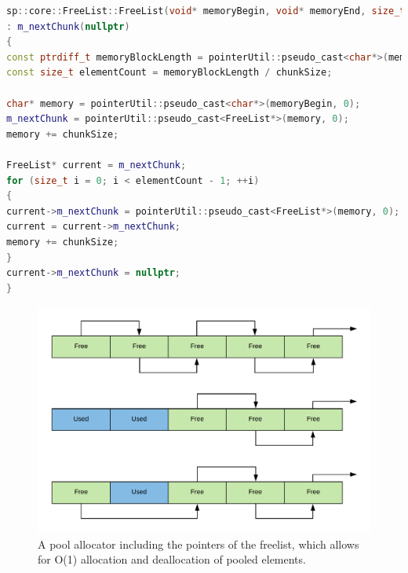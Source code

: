 \begin{lstlisting}[caption={Constructor of the FreeList class in the C++ project. It showcases how the list is created in a pre-allocated memory region.}, label={lst:freelist_ctor}, language={C++}]
sp::core::FreeList::FreeList(void* memoryBegin, void* memoryEnd, size_t chunkSize)
: m_nextChunk(nullptr)
{
const ptrdiff_t memoryBlockLength = pointerUtil::pseudo_cast<char*>(memoryEnd, 0) - pointerUtil::pseudo_cast<char*>(memoryBegin, 0);
const size_t elementCount = memoryBlockLength / chunkSize;

char* memory = pointerUtil::pseudo_cast<char*>(memoryBegin, 0);
m_nextChunk = pointerUtil::pseudo_cast<FreeList*>(memory, 0);
memory += chunkSize;

FreeList* current = m_nextChunk;
for (size_t i = 0; i < elementCount - 1; ++i)
{
current->m_nextChunk = pointerUtil::pseudo_cast<FreeList*>(memory, 0);
current = current->m_nextChunk;
memory += chunkSize;
}
current->m_nextChunk = nullptr;
}
\end{lstlisting}

\begin{figure}[h!]
	\centering \includegraphics[width=\linewidth]{PICs/pool_alloc.png}
	\caption{A pool allocator including the pointers of the freelist, which allows for O(1) allocation and deallocation of pooled elements.}
	\label{fig:pool_alloc}
\end{figure}

